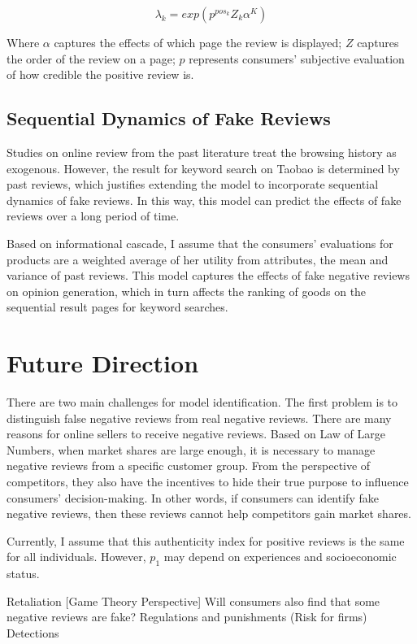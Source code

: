 ﻿\documentclass[a4paper,10pt]{article}
\begin{document}
\begin{equation}
\lambda_k = exp(p^{pos_k} Z_k \alpha^K)
\end{equation}

Where $\alpha$ captures the effects of which page the review is displayed; $Z$ captures the order of the review on a page; $p$ represents consumers’ subjective evaluation of how credible the positive review is. 

\subsection{Sequential Dynamics of Fake Reviews}
Studies on online review from the past literature treat the browsing history as exogenous. However, the result for keyword search on Taobao is determined by past reviews, which justifies extending the model to incorporate sequential dynamics of fake reviews. In this way, this model can predict the effects of fake reviews over a long period of time. 

Based on informational cascade, I assume that the consumers’ evaluations for products are a weighted average of her utility from attributes, the mean and variance of past reviews. This model captures the effects of fake negative reviews on opinion generation, which in turn affects the ranking of goods on the sequential result pages for keyword searches. 

\section{Future Direction} \label{future}
There are two main challenges for model identification. The first problem is to distinguish false negative reviews from real negative reviews. There are many reasons for online sellers to receive negative reviews. Based on Law of Large Numbers, when market shares are large enough, it is necessary to manage negative reviews from a specific customer group. From the perspective of competitors, they also have the incentives to hide their true purpose to influence consumers' decision-making. In other words, if consumers can identify fake negative reviews, then these reviews cannot help competitors gain market shares. 


Currently, I assume that this authenticity index for positive reviews is the same for all individuals. However, $p_1$ may depend on experiences and socioeconomic status. 

Retaliation [Game Theory Perspective]
Will consumers also find that some negative reviews are fake?
Regulations and punishments (Risk for firms)
Detections


\medskip
\printbibliography
\end{document}
